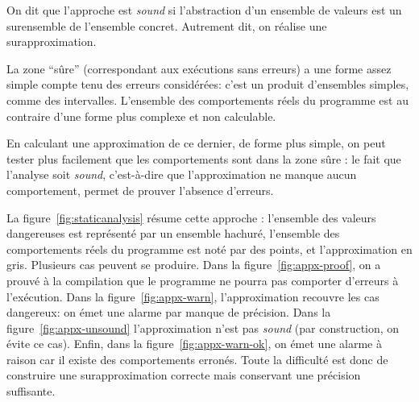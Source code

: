 On dit que l'approche est \emph{sound} si l'abstraction d'un ensemble de valeurs
est un surensemble de l'ensemble concret. Autrement dit, on réalise une
surapproximation.

La zone \enquote{sûre} (correspondant aux exécutions sans erreurs) a une forme
assez simple compte tenu des erreurs considérées: c'est un produit d'ensembles
simples, comme des intervalles. L'ensemble des comportements réels du programme
est au contraire d'une forme plus complexe et non calculable.

En calculant une approximation de ce dernier, de forme plus simple, on peut
tester plus facilement que les comportements sont dans la zone sûre : le fait
que l'analyse soit \emph{sound}, c'est-à-dire que l'approximation ne manque
aucun comportement, permet de prouver l'absence d'erreurs.

La figure~\ref{fig:staticanalysis} résume cette approche : l'ensemble des
valeurs dangereuses est représenté par un ensemble hachuré, l'ensemble des
comportements réels du programme est noté par des points, et l'approximation en
gris. Plusieurs cas peuvent se produire. Dans la figure~\ref{fig:appx-proof}, on
a prouvé à la compilation que le programme ne pourra pas comporter d'erreurs à
l'exécution. Dans la figure~\ref{fig:appx-warn}, l'approximation recouvre les
cas dangereux: on émet une alarme par manque de précision. Dans la
figure~\ref{fig:appx-unsound} l'approximation n'est pas \emph{sound} (par
construction, on évite ce cas). Enfin, dans la figure~\ref{fig:appx-warn-ok}, on
émet une alarme à raison car il existe des comportements erronés. Toute la
difficulté est donc de construire une surapproximation correcte mais conservant
une précision suffisante.

